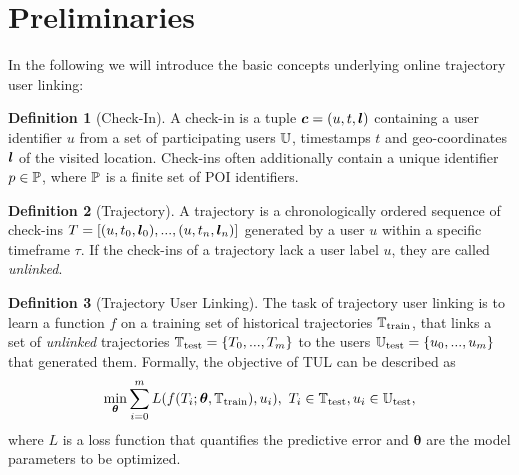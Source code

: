 \documentclass{article} %
\theoremstyle{definition}
\newtheorem{definition}{Definition}[section]
\begin{document}
\section{Preliminaries}

In the following we will introduce the basic concepts underlying online trajectory user linking:


\begin{definition}[Check-In]
    A check-in is a tuple ${\bm{c}} = (u, t, {\bm{l}})$ containing a user identifier $u$ from a set of participating users ${\mathbb{U}}$, timestamps $t$ and geo-coordinates ${\bm{l}}$ of the visited location.
    Check-ins often additionally contain a unique identifier $p\in{\mathbb{P}}$, where ${\mathbb{P}}$ is a finite set of POI identifiers.
\end{definition}

\begin{definition}[Trajectory]
    A trajectory is a chronologically ordered sequence of check-ins $T = [(u, t_0, {\bm{l}}_0), ..., (u, t_n, {\bm{l}}_n)]$ generated by a user $u$ within a specific timeframe $\tau$. If the check-ins of a trajectory lack a user label $u$, they are called \textit{unlinked}.
\end{definition}

\begin{definition}[Trajectory User Linking] %
    The task of trajectory user linking is to learn a function $f$ on a training set of historical trajectories ${\mathbb{T}}_{\textrm{train}}$, that links a set of \textit{unlinked} trajectories ${\mathbb{T}}_{\textrm{test}} = \{T_0, ..., T_m\}$ to the users ${\mathbb{U}}_{\textrm{test}} = \{u_0,...,u_m\}$ that generated them. Formally, the objective of TUL can be described as
    \begin{equation}
        \min_{\bm{\theta}} \sum_{i=0}^{m} L(f(T_i; \bm{\theta}, {\mathbb{T}}_{\textrm{train}}), u_i), \ T_i \in {\mathbb{T}}_{\textrm{test}}, u_i \in {\mathbb{U}}_{\textrm{test}},
    \end{equation}
    where $L$ is a loss function that quantifies the predictive error and $\bm{\theta}$ are the model parameters to be optimized.
\end{definition}
\end{document}
